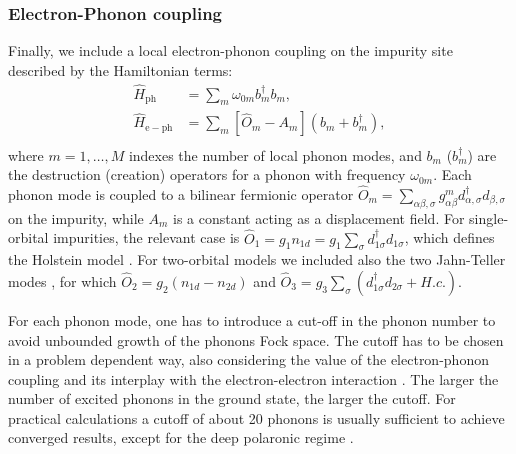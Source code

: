 \documentclass[edipack_sp.tex]{subfiles}
\begin{document}
\subsubsection{Electron-Phonon coupling}
Finally, we include a local electron-phonon coupling on the impurity site
described by the Hamiltonian terms: 
\begin{equation}\label{Hph}
  \begin{split}
    \hat{H}_\mathrm{ph}&=\sum_m \omega_{0m} b_m^\dagger b_m,   \\
    \hat{H}_\mathrm{e-ph} &= \sum_m [ \hat{O}_m - A_m](b_m+b_m^\dagger), \\
\end{split}
\end{equation}
where $m=1,\dots,M$ indexes the number of local phonon modes, and $b_m$
($b_m^\dagger$) are the destruction (creation) operators for a phonon with
frequency $\omega_{0m}$. Each phonon mode is coupled to a bilinear fermionic operator $\hat{O}_m= \sum_{\alpha \beta, \sigma }g^{m}_{\alpha \beta} d^\dagger_{\alpha, \sigma} d_{\beta, \sigma}$ on the impurity, while $A_m$ is a constant acting as a displacement field.  %
%
For single-orbital impurities, the relevant case is $\hat{O}_1 = g_1 n_{1d} = g_1 \sum_{\sigma} d^{\dagger}_{1\sigma}d_{1\sigma}$, which defines the Holstein model \cite{Holstein1959APNY}. For two-orbital models we included also the two Jahn-Teller modes \cite{Capone2010AICMP}, for which $\hat{O}_2 = g_2(n_{1d} - n_{2d})$ \cite{Scazzola2023PRB} and $\hat{O}_3 = g_3 \sum_{\sigma} (d^{\dagger}_{1\sigma}d_{2\sigma}+ H.c.)$. 

For each phonon mode, one has to introduce a cut-off in the phonon number to avoid unbounded growth of the phonons Fock space. The cutoff has to be chosen in a problem dependent way, also considering the value of the electron-phonon coupling \cite{Capone2003PRL,Capone2006PRB} and its interplay with the electron-electron interaction \cite{Capone2004PRL,Capone2004PRLsc,Sangiovanni2005PRL,Paci2005PRL,Sangiovanni2006PRL,Sangiovanni2006PRBa,Paci2006PRB}. 
The larger the number of excited phonons in the ground state, the larger the cutoff. 
For practical calculations a cutoff of about 20 phonons is usually sufficient to achieve converged results, except for the deep polaronic regime \cite{Capone2003PRL}.
\end{document}
